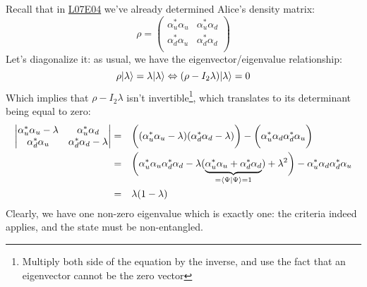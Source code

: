 \documentclass[solutions.tex]{subfiles}
\begin{document}
Recall that in
\href{https://github.com/mbivert/ttm/blob/master/qm/L07E04.pdf}{L07E04}
we've already determined Alice's density matrix:
\[
	\rho = \begin{pmatrix}
		\alpha_u^*\alpha_u & \alpha_u^*\alpha_d \\
		\alpha_d^*\alpha_u & \alpha_d^*\alpha_d \\
	\end{pmatrix}
\]
Let's diagonalize it: as usual, we have the eigenvector/eigenvalue
relationship:
\[
	\rho|\lambda\rangle = \lambda|\lambda\rangle
	\Leftrightarrow
	(\rho-I_2\lambda)|\lambda\rangle = 0
\]
Which implies that $\rho-I_2\lambda$ isn't invertible\footnote{Multiply
both side of the equation by the inverse, and use the fact that
an eigenvector cannot be the zero vector}, which translates
to its determinant being equal to zero:
\begin{equation*}\begin{aligned}
	\begin{vmatrix}
		\alpha_u^*\alpha_u-\lambda & \alpha_u^*\alpha_d \\
		\alpha_d^*\alpha_u & \alpha_d^*\alpha_d-\lambda \\
	\end{vmatrix} &=&& \biggl(
		(\alpha_u^*\alpha_u-\lambda)(\alpha_d^*\alpha_d-\lambda)
	\biggr)
	-
	\biggl(
		\alpha_u^*\alpha_d\alpha_d^*\alpha_u
	\biggr) \\
	~ &=&& \biggl(
		\alpha_u^*\alpha_u\alpha_d^*\alpha_d -\lambda(
			\underbrace{\alpha_u^*\alpha_u+\alpha_d^*\alpha_d}_{%
			=\braket{\Psi}{\Psi}=1}
		) +\lambda^2
	\biggr)-\alpha_u^*\alpha_d\alpha_d^*\alpha_u \\
	~ &=&& \lambda(1-\lambda)
\end{aligned}\end{equation*}
Clearly, we have one non-zero eigenvalue which is exactly one: the criteria
indeed applies, and the state must be non-entangled.
\end{document}
